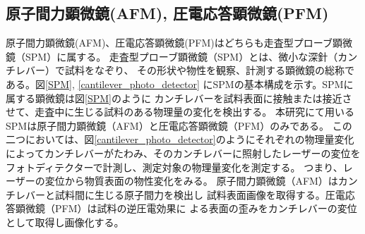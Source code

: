 \documentclass[dvipdfmx,12pt,a4paper]{jreport}
\begin{document}
			\subsection{原子間力顕微鏡(AFM), 圧電応答顕微鏡(PFM)}
			原子間力顕微鏡(AFM)、圧電応答顕微鏡(PFM)はどちらも走査型プローブ顕微鏡（SPM）に属する。
			走査型プローブ顕微鏡（SPM）とは、微小な深針（カンチレバー）で試料をなぞり、
			その形状や物性を観察、計測する顕微鏡の総称である。図\ref{SPM}, \ref{cantilever_photo_detector}
			にSPMの基本構成を示す。SPMに属する顕微鏡は図\ref{SPM}のように
			カンチレバーを試料表面に接触または接近させて、走査中に生じる試料のある物理量の変化を検出する。
			本研究にて用いるSPMは原子間力顕微鏡（AFM）と圧電応答顕微鏡（PFM）のみである。
			この二つにおいては、図\ref{cantilever_photo_detector}のようにそれぞれの物理量変化
			によってカンチレバーがたわみ、そのカンチレバーに照射したレーザーの変位を
			フォトディテクターで計測し、測定対象の物理量変化を測定する。
			つまり、レーザーの変位から物質表面の物性変化をみる。
			原子間力顕微鏡（AFM）はカンチレバーと試料間に生じる原子間力を検出し
			試料表面画像を取得する。圧電応答顕微鏡（PFM）は試料の逆圧電効果に
			よる表面の歪みをカンチレバーの変位として取得し画像化する。
\end{document}

